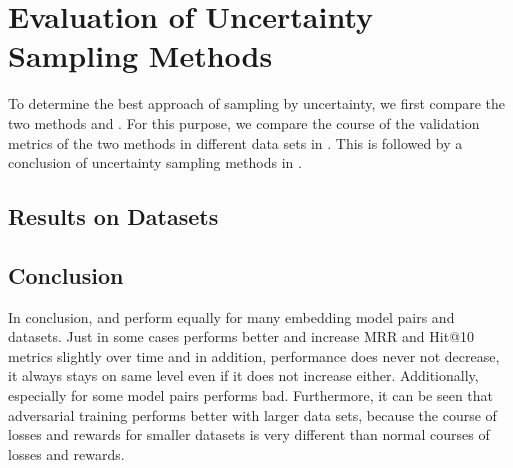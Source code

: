 \section{Evaluation of Uncertainty Sampling Methods}
\label{ch:evaluation:sec:evaluation_methods}
%
To determine the best approach of sampling by uncertainty, we first compare the two methods \usmax and \ussoftmax.
For this purpose, we compare the course of the validation metrics of the two methods in different data sets in .
This is followed by a conclusion of uncertainty sampling methods in  .
%
\subsection{Results on Datasets} \label{subsec:methods_results}





%
\subsection{Conclusion} 
\label{subsec:methods_conclusion}
%
In conclusion, \usmax and \ussoftmax perform equally for many embedding model pairs and datasets.
Just in some cases \ussoftmax performs better and increase MRR and Hit@10 metrics slightly over time and in addition, performance does never not decrease, it always stays on same level even if it does not increase either.
Additionally, especially for some model pairs \usmax performs bad.
Furthermore, it can be seen that adversarial training performs better with larger data sets, because the course of losses and rewards for smaller datasets is very different than normal courses of losses and rewards.

